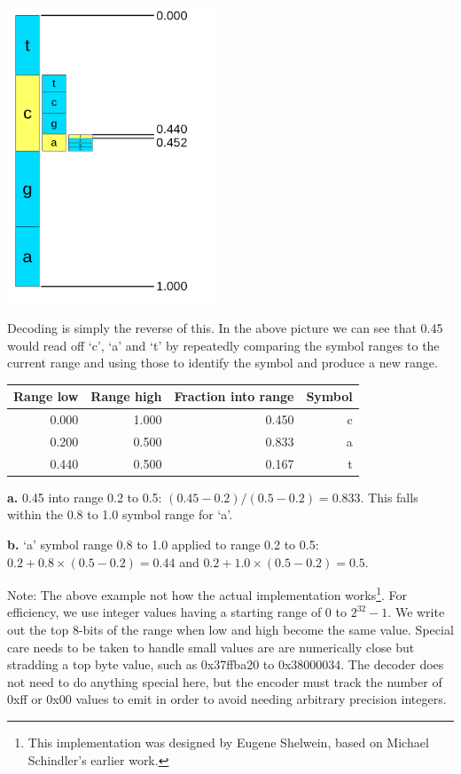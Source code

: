 \documentclass[a4paper]{article}
\begin{document}
\includegraphics[height=250pt, keepaspectratio=true]{img/range_code.png}

Decoding is simply the reverse of this.  In the above picture we can see that 0.45 would read off `c', `a' and `t' by repeatedly comparing the symbol ranges to the current range and using those to identify the symbol and produce a new range.

\begin{threeparttable}[t]
\begin{tabular}{rrrr}
\hline
\textbf{Range low} & \textbf{Range high} & \textbf{Fraction into range} & \textbf{Symbol}\\
\hline
0.000 & 1.000 & 0.450 & c\\
0.200 & 0.500 & 0.833\tnote{\textbf{a}} & a\\
0.440\tnote{\textbf{b}} & 0.500 & 0.167 & t\\
\hline
\end{tabular}
\begin{tablenotes}
\item{\textbf{a.}} 0.45 into range 0.2 to 0.5: $(0.45-0.2)/(0.5-0.2) = 0.833$.
This falls within the 0.8 to 1.0 symbol range for `a'.
\item{\textbf{b.}} `a' symbol range 0.8 to 1.0 applied to range 0.2 to 0.5:  $0.2+0.8\times(0.5-0.2) = 0.44$ and $0.2+1.0\times(0.5-0.2) = 0.5$.
\end{tablenotes}
\end{threeparttable}

Note: The above example not how the actual implementation works\footnote{This implementation was designed by Eugene Shelwein, based on Michael Schindler's earlier work.}.
For efficiency, we use integer values having a starting range of 0 to $2^{32}-1$.
We write out the top 8-bits of the range when low and high become the same value.
Special care needs to be taken to handle small values are are numerically close but stradding a top byte value, such as 0x37ffba20 to 0x38000034.
The decoder does not need to do anything special here, but the encoder must track the number of 0xff or 0x00 values to emit in order to avoid needing arbitrary precision integers.
\end{document}
